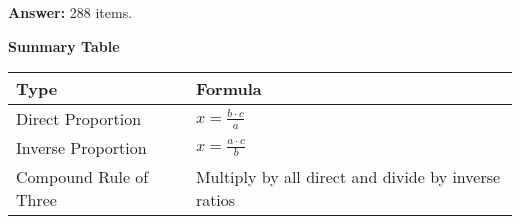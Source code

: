 \textbf{Answer:} 288 items.
\vspace{\baselineskip}

\textbf{Summary Table}

\begin{center}
\begin{tabular}{|l|l|}
\hline
\textbf{Type} & \textbf{Formula} \\
\hline
Direct Proportion & \(x = \frac{b \cdot c}{a}\) \\
Inverse Proportion & \(x = \frac{a \cdot c}{b}\) \\
Compound Rule of Three & Multiply by all direct and divide by inverse ratios \\
\hline
\end{tabular}
\end{center}

